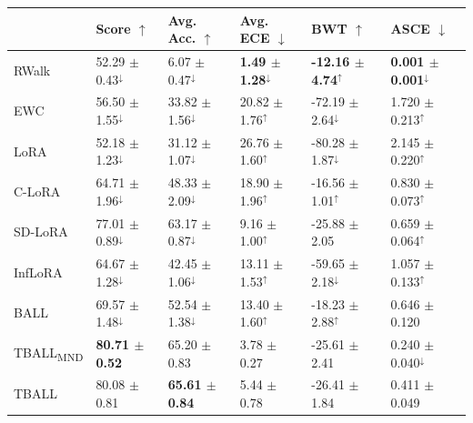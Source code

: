 \begin{tabular}{llllll}
\toprule
 & {\small Score $\uparrow$} & {\small Avg. Acc. $\uparrow$} & {\small Avg. ECE $\downarrow$} & {\small BWT $\uparrow$} & {\small ASCE $\downarrow$} \\
\midrule
RWalk & \small 52.29 $\pm$ 0.43$^{\downarrow}$ & \small 6.07 $\pm$ 0.47$^{\downarrow}$ & \small \textbf{1.49 $\pm$ 1.28}$^{\downarrow}$ & \small \textbf{-12.16 $\pm$ 4.74}$^{\uparrow}$ & \small \textbf{0.001 $\pm$ 0.001}$^{\downarrow}$ \\
EWC & \small 56.50 $\pm$ 1.55$^{\downarrow}$ & \small 33.82 $\pm$ 1.56$^{\downarrow}$ & \small 20.82 $\pm$ 1.76$^{\uparrow}$ & \small -72.19 $\pm$ 2.64$^{\downarrow}$ & \small 1.720 $\pm$ 0.213$^{\uparrow}$ \\
LoRA & \small 52.18 $\pm$ 1.23$^{\downarrow}$ & \small 31.12 $\pm$ 1.07$^{\downarrow}$ & \small 26.76 $\pm$ 1.60$^{\uparrow}$ & \small -80.28 $\pm$ 1.87$^{\downarrow}$ & \small 2.145 $\pm$ 0.220$^{\uparrow}$ \\
C-LoRA & \small 64.71 $\pm$ 1.96$^{\downarrow}$ & \small 48.33 $\pm$ 2.09$^{\downarrow}$ & \small 18.90 $\pm$ 1.96$^{\uparrow}$ & \small -16.56 $\pm$ 1.01$^{\uparrow}$ & \small 0.830 $\pm$ 0.073$^{\uparrow}$ \\
SD-LoRA & \small 77.01 $\pm$ 0.89$^{\downarrow}$ & \small 63.17 $\pm$ 0.87$^{\downarrow}$ & \small 9.16 $\pm$ 1.00$^{\uparrow}$ & \small -25.88 $\pm$ 2.05 & \small 0.659 $\pm$ 0.064$^{\uparrow}$ \\
InfLoRA & \small 64.67 $\pm$ 1.28$^{\downarrow}$ & \small 42.45 $\pm$ 1.06$^{\downarrow}$ & \small 13.11 $\pm$ 1.53$^{\uparrow}$ & \small -59.65 $\pm$ 2.18$^{\downarrow}$ & \small 1.057 $\pm$ 0.133$^{\uparrow}$ \\
BALL & \small 69.57 $\pm$ 1.48$^{\downarrow}$ & \small 52.54 $\pm$ 1.38$^{\downarrow}$ & \small 13.40 $\pm$ 1.60$^{\uparrow}$ & \small -18.23 $\pm$ 2.88$^{\uparrow}$ & \small 0.646 $\pm$ 0.120 \\
TBALL\textsubscript{MND} & \small \textbf{80.71 $\pm$ 0.52} & \small 65.20 $\pm$ 0.83 & \small 3.78 $\pm$ 0.27 & \small -25.61 $\pm$ 2.41 & \small 0.240 $\pm$ 0.040$^{\downarrow}$ \\
TBALL & \small 80.08 $\pm$ 0.81 & \small \textbf{65.61 $\pm$ 0.84} & \small 5.44 $\pm$ 0.78 & \small -26.41 $\pm$ 1.84 & \small 0.411 $\pm$ 0.049 \\
\bottomrule
\end{tabular}

